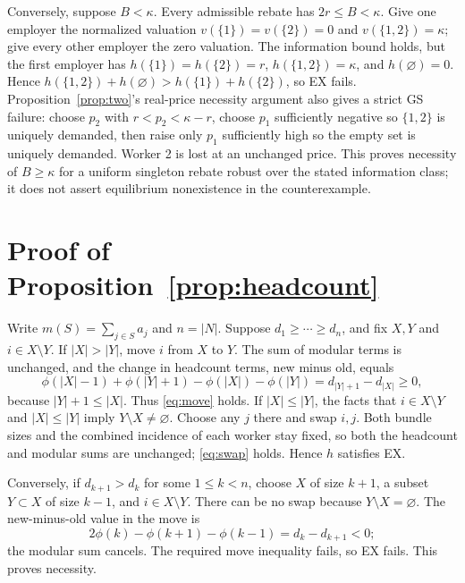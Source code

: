 \documentclass[11pt]{article}
\theoremstyle{definition}
\theoremstyle{remark}
\numberwithin{equation}{section}
\begin{document}
Conversely, suppose $B<\kappa$. Every admissible rebate has $2r\le B<\kappa$. Give one employer the normalized valuation $v(\{1\})=v(\{2\})=0$ and $v(\{1,2\})=\kappa$; give every other employer the zero valuation. The information bound holds, but the first employer has $h(\{1\})=h(\{2\})=r$, $h(\{1,2\})=\kappa$, and $h(\varnothing)=0$. Hence $h(\{1,2\})+h(\varnothing)>h(\{1\})+h(\{2\})$, so EX fails. Proposition~\ref{prop:two}'s real-price necessity argument also gives a strict GS failure: choose $p_2$ with $r<p_2<\kappa-r$, choose $p_1$ sufficiently negative so $\{1,2\}$ is uniquely demanded, then raise only $p_1$ sufficiently high so the empty set is uniquely demanded. Worker 2 is lost at an unchanged price. This proves necessity of $B\ge\kappa$ for a uniform singleton rebate robust over the stated information class; it does not assert equilibrium nonexistence in the counterexample.

\section{Proof of Proposition~\ref{prop:headcount}}\label{app:headcount}

Write $m(S)=\sum_{j\in S}a_j$ and $n=|N|$. Suppose $d_1\ge\cdots\ge d_n$, and fix $X,Y$ and $i\in X\setminus Y$. If $|X|>|Y|$, move $i$ from $X$ to $Y$. The sum of modular terms is unchanged, and the change in headcount terms, new minus old, equals
\[
\phi(|X|-1)+\phi(|Y|+1)-\phi(|X|)-\phi(|Y|)
=d_{|Y|+1}-d_{|X|}\ge0,
\]
because $|Y|+1\le|X|$. Thus \eqref{eq:move} holds. If $|X|\le|Y|$, the facts that $i\in X\setminus Y$ and $|X|\le|Y|$ imply $Y\setminus X\ne\varnothing$. Choose any $j$ there and swap $i,j$. Both bundle sizes and the combined incidence of each worker stay fixed, so both the headcount and modular sums are unchanged; \eqref{eq:swap} holds. Hence $h$ satisfies EX.

Conversely, if $d_{k+1}>d_k$ for some $1\le k<n$, choose $X$ of size $k+1$, a subset $Y\subset X$ of size $k-1$, and $i\in X\setminus Y$. There can be no swap because $Y\setminus X=\varnothing$. The new-minus-old value in the move is
\[
2\phi(k)-\phi(k+1)-\phi(k-1)=d_k-d_{k+1}<0;
\]
the modular sum cancels. The required move inequality fails, so EX fails. This proves necessity.



\end{document}
